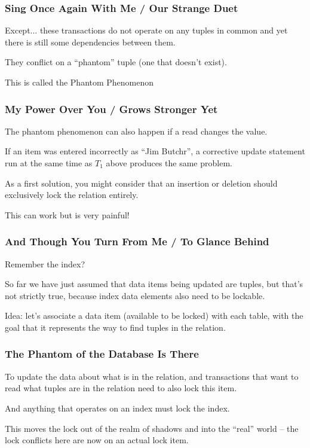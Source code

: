 \begin{frame}
\frametitle{Sing Once Again With Me / Our Strange Duet}

Except... these transactions do not operate on any tuples in common and yet there is still some dependencies between them. 

They conflict on a ``phantom'' tuple (one that doesn't exist). 

This is called the \alert{Phantom Phenomenon}

\end{frame}

\begin{frame}
\frametitle{My Power Over You / Grows Stronger Yet}
The phantom phenomenon can also happen if a read changes the value. 

If an item was entered incorrectly as ``Jim Butchr'', a corrective update statement run at the same time as $T_{1}$ above produces the same problem.

As a first solution, you might consider that an insertion or deletion should exclusively lock the relation entirely.

This can work but is very painful!

\end{frame}

\begin{frame}
\frametitle{And Though You Turn From Me / To Glance Behind}

Remember the index? 

So far we have just assumed that data items being updated are tuples, but that's not strictly true, because index data elements also need to be lockable.

Idea: let's associate a data item (available to be locked) with each table, with the goal that it represents the way to find tuples in the relation.

\end{frame}


\begin{frame}
\frametitle{The Phantom of the Database Is There}

To update the data about what is in the relation, and transactions that want to read what tuples are in the relation need to also lock this item. 

And anything that operates on an index must lock the index. 

This moves the lock out of the realm of shadows and into the ``real'' world -- the lock conflicts here are now on an actual lock item.


\end{frame}

